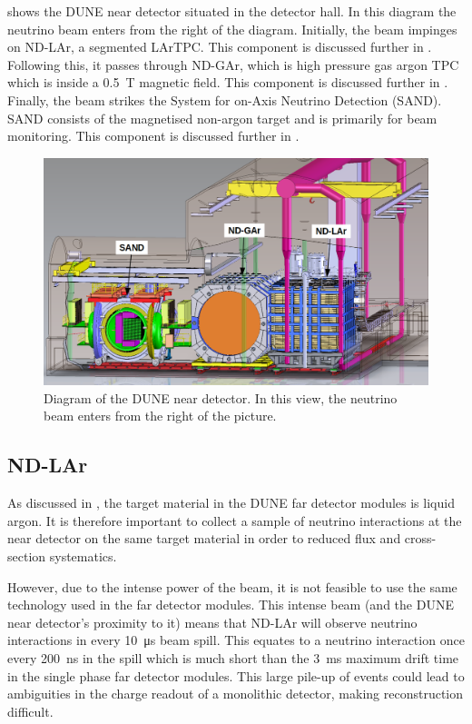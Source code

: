  shows the DUNE near detector situated in the detector hall.
In this diagram the neutrino beam enters from the right of the diagram.
Initially, the beam impinges on ND-LAr, a segmented LArTPC. This component is discussed further in .
Following this, it passes through ND-GAr, which is high pressure gas argon TPC which is inside a \SI{0.5}{\tesla} magnetic field. This component is discussed further in .
Finally, the beam strikes the System for on-Axis Neutrino Detection (SAND).
SAND consists of the magnetised non-argon target and is primarily for beam monitoring.
This component is discussed further in .

\begin{figure}[h]
  \centering
  \includegraphics[width=.9\linewidth]{files/figures/dune_detector/ndDiag.png}
  \caption[Diagram of the DUNE near detector.]{Diagram of the DUNE near detector. In this view, the neutrino beam enters from the right of the picture.}
  \label{fig:ndDiag}
\end{figure}

\subsection{ND-LAr}
\label{sec:dune:nd:lar}
As discussed in , the target material in the DUNE far detector modules is liquid argon.
It is therefore important to collect a sample of neutrino interactions at the near detector on the same target material in order to reduced flux and cross-section systematics.

However, due to the intense power of the beam, it is not feasible to use the same technology used in the far detector modules.
This intense beam (and the DUNE near detector's proximity to it) means that ND-LAr will observe  neutrino interactions in every \SI{10}{\micro\second} beam spill.
This equates to a neutrino interaction once every \SI{200}{\nano\second} in the spill which is much short than the \SI{3}{\milli\second} maximum drift time in the single phase far detector modules.
This large pile-up of events could lead to ambiguities in the charge readout of a monolithic detector, making reconstruction difficult.

